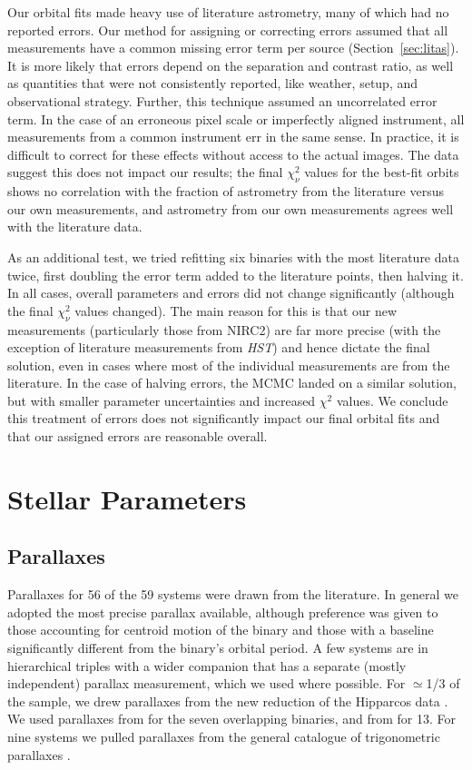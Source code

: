 \documentclass[twocolumn]{aastex62}
\begin{document}
Our orbital fits made heavy use of literature astrometry, many of which had no reported errors. Our method for assigning or correcting errors assumed that all measurements have a common missing error term per source (Section~\ref{sec:litas}). It is more likely that errors depend on the separation and contrast ratio, as well as quantities that were not consistently reported, like weather, setup, and observational strategy. Further, this technique assumed an uncorrelated error term. In the case of an erroneous pixel scale or imperfectly aligned instrument, all measurements from a common instrument err in the same sense.   In practice, it is difficult to correct for these effects without access to the actual images. The data suggest this does not impact our results; the final $\chi^2_\nu$ values for the best-fit orbits shows no correlation with the fraction of astrometry from the literature versus our own measurements, and astrometry from our own measurements agrees well with the literature data. 

As an additional test, we tried refitting six binaries with the most literature data twice, first doubling the error term added to the literature points, then halving it. In all cases, overall parameters and errors did not change significantly (although the final $\chi^2_\nu$ values changed). The main reason for this is that our new measurements (particularly those from NIRC2) are far more precise (with the exception of literature measurements from {\it HST}) and hence dictate the final solution, even in cases where most of the individual measurements are from the literature. In the case of halving errors, the MCMC landed on a similar solution, but with smaller parameter uncertainties and increased $\chi^2$ values. We conclude this treatment of errors does not significantly impact our final orbital fits and that our assigned errors are reasonable overall.

\section{Stellar Parameters}\label{sec:params}

\subsection{Parallaxes}\label{sec:plx}

Parallaxes for 56 of the 59 systems were drawn from the literature. In general we adopted the most precise parallax available, although preference was given to those accounting for centroid motion of the binary and those with a baseline significantly different from the binary's orbital period. A few systems are in hierarchical triples with a wider companion that has a separate (mostly independent) parallax measurement, which we used where possible. For $\simeq$1/3 of the sample, we drew parallaxes from the new reduction of the Hipparcos data \citep{van-Leeuwen:2007yq}. We used parallaxes from \citet{Dupuy2017} for the seven overlapping binaries, and from \citet{Benedict2016} for 13. For nine systems we pulled parallaxes from the general catalogue of trigonometric parallaxes \citep{van-Altena1995}.  
\end{document}
